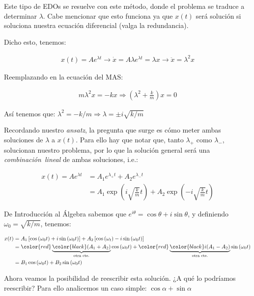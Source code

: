 \documentclass[letterpaper,11pt]{article}
\begin{document}
\noindent Este tipo de EDOs se resuelve con este método, donde el problema se traduce a determinar $\lambda$. Cabe mencionar que esto funciona ya que $x(t)$ será solución si soluciona nuestra ecuación diferencial (valga la redundancia).

\noindent Dicho esto, tenemos:

\begin{align*}
    x(t) = Ae^{\lambda t} \longrightarrow \dot{x}=A\lambda e^{\lambda t}=\lambda x \longrightarrow \ddot{x}=\lambda^2 x
\end{align*}

\noindent Reemplazando en la ecuación del MAS:

\begin{align*}
    m\lambda^2x = -kx \Rightarrow \left(\lambda^2 +\frac{k}{m}\right)x = 0
\end{align*}

\noindent Así tenemos que: $\lambda^2 = -k/m \Rightarrow \lambda = \pm i \sqrt{k/m}$

\noindent Recordando nuestro \textit{ansatz}, la pregunta que surge es cómo meter ambas soluciones de $\lambda$ a $x(t)$. Para ello hay que notar que, tanto $\lambda_+$ como $\lambda_-$, solucionan nuestro problema, por lo que la solución general será una \textit{combinación~lineal} de ambas soluciones, i.e.:

\begin{align*}
    x(t) = Ae^{\lambda t} &= A_1 e^{\lambda_+t} + A_2 e^{\lambda_- t}\\
    &= A_1\exp{\left(i\sqrt{\frac{k}{m}}t\right)} + A_2\exp{\left(-i\sqrt{\frac{k}{m}}t\right)}
\end{align*}

\noindent De Introducción al Álgebra sabemos que $e^{i\theta} = \cos{\theta}+i\sin{\theta}$, y definiendo $\omega_0=\sqrt{k/m}$, tenemos:

\begin{align*}
    x(t) &= A_1\left[\cos{(\omega_0 t)} + i\sin{(\omega_0 t)}\right] + A_2\left[\cos{(\omega_t)}-i\sin{(\omega_0 t)}\right]\\
    &= {\color{red}\underbrace{\color{black}(A_1+A_2)}_\textrm{otra cte.}}\cos{(\omega_0t)} + {\color{red}\underbrace{\color{black}i(A_1-A_2)}_\textrm{otra cte.}}\sin{(\omega_0t)}\\
    &= B_1\cos{(\omega_0 t)} + B_2\sin{(\omega_0t)}
\end{align*}

\noindent Ahora veamos la posibilidad de reescribir esta solución. ¿A qué lo podríamos reescribir? Para ello analicemos un caso simple: $\cos{\alpha}+\sin{\alpha}$
\end{document}

